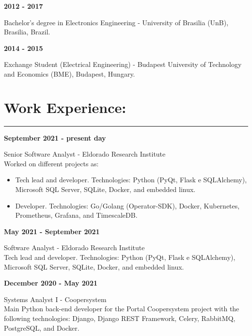 \documentclass[11pt]{article}
\begin{document}
\textbf{2012 - 2017}
\begin{addmargin}{0.5cm}
Bachelor's degree in Electronics Engineering - University of Brasilia (UnB), Brasilia, Brazil. \\
\end{addmargin}

\textbf{2014 - 2015}
\begin{addmargin}{0.5cm}
Exchange Student (Electrical Engineering) - Budapest University of Technology and Economics (BME), Budapest, Hungary.
\end{addmargin}

\section{Work Experience:}
\hrule \vspace{0.1cm}

\textbf{September 2021 - present day}
\begin{addmargin}{0.5cm}
Senior Software Analyst - Eldorado Research Institute\\
Worked on different projects as:
\begin{itemize}
    \item Tech lead and developer. Technologies: Python (PyQt, Flask e SQLAlchemy), Microsoft SQL Server, SQLite, Docker, and embedded linux.
    \item Developer. Technologies: Go/Golang (Operator-SDK), Docker, Kubernetes, Prometheus, Grafana, and TimescaleDB. \\
\end{itemize}
\end{addmargin}

\newpage
\textbf{May 2021 - September 2021}
\begin{addmargin}{0.5cm}
Software Analyst - Eldorado Research Institute \\
Tech lead and developer. Technologies: Python (PyQt, Flask e SQLAlchemy), Microsoft SQL Server, SQLite, Docker, and embedded linux.\\
\end{addmargin}

\textbf{December 2020 - May 2021}
\begin{addmargin}{0.5cm}
    Systems Analyst I - Coopersystem \\
    Main Python back-end developer for the Portal Coopersystem project with the following technologies: Django, Django REST Framework, Celery, RabbitMQ, PostgreSQL, and Docker.\\
\end{addmargin}
\end{document}

